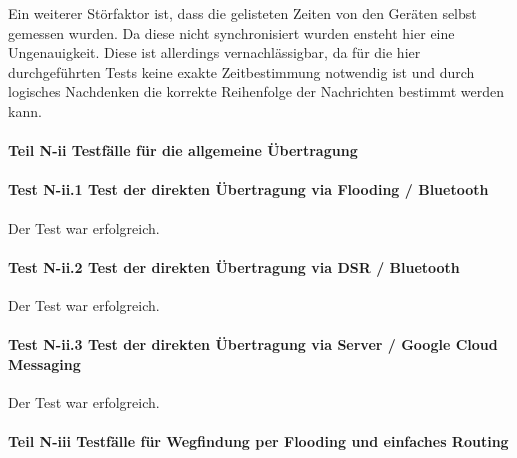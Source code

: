 Ein weiterer Störfaktor ist, dass die gelisteten Zeiten von den Geräten selbst gemessen wurden. Da diese nicht synchronisiert wurden ensteht hier eine Ungenauigkeit. Diese ist allerdings vernachlässigbar, da für die hier durchgeführten Tests keine exakte Zeitbestimmung notwendig ist und durch logisches Nachdenken die korrekte Reihenfolge der Nachrichten bestimmt werden kann.


\paragraph{Teil N-ii Testfälle für die allgemeine Übertragung}

\paragraph{Test N-ii.1 Test der direkten Übertragung via Flooding / Bluetooth}

Der Test war erfolgreich.



\paragraph{Test N-ii.2 Test der direkten Übertragung via DSR / Bluetooth}

Der Test war erfolgreich.




\paragraph{Test N-ii.3 Test der direkten Übertragung via Server / Google Cloud Messaging}

Der Test war erfolgreich.




\paragraph{Teil N-iii Testfälle für Wegfindung per Flooding und einfaches Routing}

